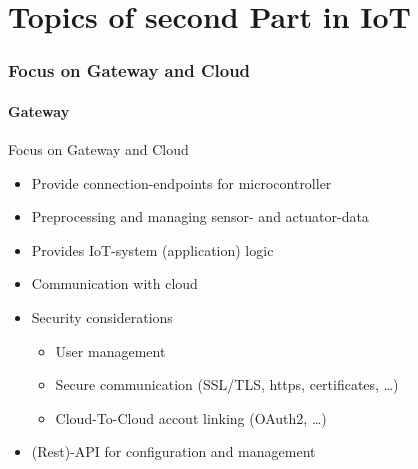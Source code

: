 ﻿\part{Topics of second Part in IoT}
\section{Focus on Gateway and Cloud}
\subsection{Gateway}

\begin{frame}{Focus on Gateway and Cloud}
  \begin{description}[Gateway]
    \item[Gateway]
    \begin{itemize}
      \item Provide connection-endpoints for microcontroller
      \item Preprocessing and managing sensor- and actuator-data
      \item Provides IoT-system (application) logic
      \item Communication with cloud
      \item Security considerations
      \begin{itemize}
        \item User management
        \item Secure communication (SSL/TLS, https, certificates, \ldots)
        \item Cloud-To-Cloud accout linking (OAuth2, \ldots)
      \end{itemize}
      \item (Rest)-API for configuration and management
    \end{itemize}
  \end{description}
\end{frame}
